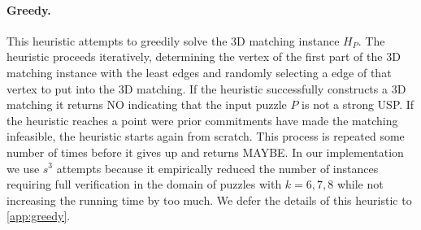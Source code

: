 \documentclass[11pt]{article}
\begin{document}



\vspace{-2ex}
\paragraph{Greedy.}
This heuristic attempts to greedily solve the 3D matching instance
$H_P$.  The heuristic proceeds iteratively, determining the vertex of
the first part of the 3D matching instance with the least edges and randomly
selecting a edge of that vertex to put into the 3D matching.  If the
heuristic successfully constructs a 3D matching it returns NO indicating that
the input puzzle $P$ is not a strong USP.  If the heuristic reaches a
point were prior commitments have made the matching infeasible, the
heuristic starts again from scratch.  This process is repeated some
number of times before it gives up and returns MAYBE.  In our
implementation we use $s^3$ attempts because it empirically reduced
the number of instances requiring full verification in the domain of
puzzles with $k = 6, 7, 8$ while not increasing the running time by
too much.  We defer the details of this heuristic to
\autoref{app:greedy}.



\end{document}
